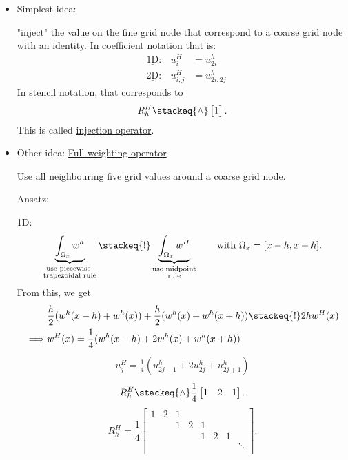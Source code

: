 \begin{itemize}
	\item Simplest idea:

		"inject" the value on the fine grid node that correspond to a coarse grid node with an identity. In coefficient notation that is:
		\begin{align*}
			&\underline{\text{1D}}:& u_{i}^{H} &= u_{2i}^{h} \\
			&\underline{\text{2D}}:& u_{i,j}^{H} &= u_{2i, 2j}^{h}
		\end{align*}
		In stencil notation, that corresponds to
		\[
			R_{h}^{H} \stackeq{\wedge} \begin{bmatrix}
				1
			\end{bmatrix}
		.\] 
		This is called \underline{injection operator}. 

	\item Other idea: \underline{Full-weighting operator} 

		Use all neighbouring five grid values around a coarse grid node.

		Ansatz:

		\underline{1D}:
		\[
			\underbrace{\int_{\Omega_{x}}w^{h}}_{\substack{\text{use
			piecewise }\\\text{trapezoidal rule}}}
			\stackeq{!}
			\underbrace{\int_{\Omega_{x}}w^{H}}_{\substack{\text{use
			midpoint}\\\text{rule}}} \qquad \text{with }
			\Omega_{x} = [x-h, x+h]  
		.\] 
		From this, we get
		\begin{align*}
			&\frac{h}{2}(w^{h}(x-h) + w^{h}(x)) + \frac{h}{2}(w^{h}(x) + w^{h}(x+h)) \stackeq{!} 2hw^{H}(x) \\
			\implies&w^{H}(x) = \frac{1}{4}(w^{h}(x-h)+2w^{h}(x) + w^{h}(x+h))
		\end{align*}
		\begin{align*}
			u_{j}^{H}= \frac{1}{4}(u_{2j-1}^{h}+2u_{2j}^{h}+ u_{2j+1}^{h})
		\end{align*}
		\[
			R_{h}^{H}\stackeq{\wedge}\frac{1}{4}\begin{bmatrix}
				1 & 2 & 1
			\end{bmatrix}
		.\] 
		\[
			R_{h}^{H}= \frac{1}{4}\begin{bmatrix}
				1 & 2 & 1 \\
				  &   & 1 & 2 & 1 \\
				  &   &   &   & 1 & 2 & 1 \\
				  &   &   &   &   &   &   & \ddots \\
			\end{bmatrix}
		.\] 


\end{itemize}
